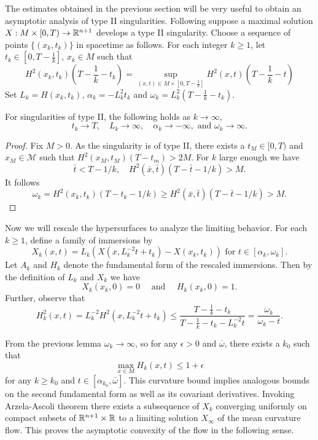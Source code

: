     The estimates obtained in the previous section will be very useful to obtain an asymptotic analysis of type II singularities. Following \cite{huisken1999mean} suppose a maximal solution  $X: M \times [0, T) \to \mathbb{R}^{n+1} $ develops a type II singularity. Choose a sequence of points $ \{(x_{k},t_{k})\} $ in spacetime as follows. For each integer $ k \ge 1 $, let $ t_{k} \in [0,T-\frac{1}{k}] $, $ x_{k} \in M $ such that \begin{equation}
        H^{2}(x_{k},t_{k})\left( T- \frac{1}{k}-t_{k} \right) = \sup_{(x,t) \in M \times\left[0,T-\frac{1}{k}\right]}H^{2}(x,t)\left(  T- \frac{1}{k}- t\right)
    \end{equation}
    Set $ L_{k} = H(x_{k},t_{k}) $, $ \alpha_{k} = -L^{2}_{k}t_{k} $ and $ \omega_{k} = L_{k}^{2}(T-\frac{1}{k}-t_{k}) $. 
    \begin{lemma}
        For singularities of type II, the following holds as $ k \to \infty $, 
        \[ t_{k} \to T, \quad L_{k} \to \infty,\quad  \alpha_{k} \to -\infty,\text{ and } \omega_{k} \to \infty .\]
    \end{lemma}
    \begin{proof}%
        Fix $ M  >0 $. As the singularity is of type II, there exists a $ t_{M} \in [0, T) $ and $ x_{M} \in \mathcal{M} $ such that $ H^{2}(x_{M},t_{M})(T-t_{m})> 2M $. For $ k $ large enough we have
        $$
        \bar{t}<T-1 / k, \quad H^2(\bar{x}, \bar{t})(T-\bar{t}-1 / k)>M.
        $$
        It follows
        $$
        \omega_k=H^2\left(x_k, t_k\right)\left(T-t_k-1 / k\right) \geq H^2(\bar{x}, \bar{t})(T-\bar{t}-1 / k)>M .
        $$
    \end{proof}
    Now we will rescale the hypersurfaces to analyze the limiting behavior. For each $ k \ge 1 $, define a family of immersions by 
    \[ X_{k}(x, t) = L_{k}(X(x, L_{k}^{-2}t+t_{k})-X(x_{k},t_{k}))  \text{ for } t \in [\alpha_{k}, \omega_{k}].\]
    Let $ A_{k} $ and $ H_{k} $ denote the fundamental form of the rescaled immersions. Then by the definition of $ L_{k} $ and $ X_{k} $ we have 
    \[ X_{k}(x_{k},0) = 0 \quad \text{ and }\quad H_{k}(x_{k},0)=1.\]
    Further,  observe that 
    \[ H_{k}^{2}(x,t) = L_{k}^{-2}H^{2}(x, L_{k}^{-2}t+t_{k}) \le \frac{T - \frac{1}{k}-t_{k}}{T-\frac{1}{k}-t_{k}-L_{k}^{-2}t} = \frac{\omega_{k}}{\omega_{k}-t}. \]

    From the previous lemma $ \omega_{k} \to \infty $, so for any $ \epsilon >0 $ and $ \overline{\omega} $, there exists a $ k_{0} $ such that 
    \[ \max_{x \in M} H_{k}(x,t) \le 1+\epsilon \]
    for any $ k \ge k_{0} $ and $ t \in [\alpha_{k_{0}}, \overline{\omega}] $. This curvature bound implies analogous bounds on the second fundamental form as well as its covariant derivatives. Invoking Arzela-Ascoli theorem there exists a subsequence of $ X_{k} $ converging uniformly on compact subsets of $ \mathbb{R}^{n+1} \times \mathbb{R} $ to a limiting solution $ X_{\infty} $ of the mean curvature flow. This proves the asymptotic convexity of the flow in the following sense.
     

